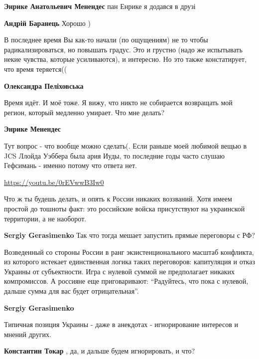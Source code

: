 \begin{itemize}
\begin{itemize}
\textbf{Энрике Анатольевич Менендес} пан Енрике я додався в друзі

\textbf{Андрій Баранець} Хорошо )
\end{itemize} %


В последнее время Вы как-то начали (по ощущениям) не то чтобы
радикализироваться, но повышать градус. Это и грустно (надо же испытывать некие
чувства, которые усиливаются), и интересно. Но это также констатирует, что
время теряется((

\begin{itemize} %
\textbf{Олександра Пеліховська} 

Время идёт. И моё тоже. Я вижу, что никто не собирается возвращать мой регион,
который медленно умирает. Что мне делать?

\textbf{Энрике Менендес}

Тут вопрос - что вообще можно сделать(. Если раньше моей любимой вещью в JCS
Ллойда Уэббера была ария Иуды, то последние годы часто слушаю Гефсимань -
именно потому что ответа нет.

\url{https://youtu.be/0rEVwwB3Iw0}
\end{itemize} %


Что ж ты будешь делать, и опять к России никаких воззваний. Хотя имеем простой
до тошноты факт: это российские войска присутствуют на украинской территории, а
не наоборот.

\begin{itemize} %
\textbf{Sergiy Gerasimenko} Так что тогда мешает запустить прямые переговоры с РФ?


Возведенный со стороны России в ранг экзистенционального масштаб конфликта, из
которого истекает единственная логика таких переговоров: капитуляция и отказ
Украины от субъектности. Игра с нулевой суммой не предполагает никаких
компромиссов. А россияне еще приговаривают: \enquote{Радуйтесь, что пока с нулевой,
дальше сумма для вас будет отрицательная}.

\textbf{Sergiy Gerasimenko} 

Типичная позиция Украины - даже в анекдотах - игнорирование интересов и мнений других.

\textbf{Константин Токар} , да, и дальше будем игнорировать, и что?


\end{itemize}
\end{itemize}
